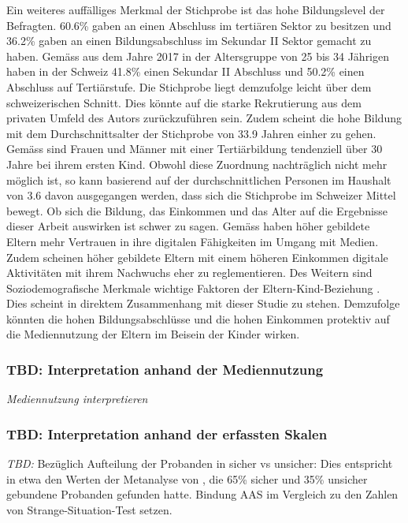 Ein weiteres auffälliges Merkmal der Stichprobe ist das hohe Bildungslevel der Befragten. 60.6\% gaben an einen Abschluss im tertiären Sektor zu besitzen und 36.2\% gaben an einen Bildungsabschluss im Sekundar II Sektor gemacht zu haben. Gemäss  aus dem Jahre 2017 in der Altersgruppe von 25 bis 34 Jährigen haben in der Schweiz 41.8\% einen Sekundar II Abschluss und 50.2\% einen Abschluss auf Tertiärstufe. Die Stichprobe liegt demzufolge leicht über dem schweizerischen Schnitt. Dies könnte auf die starke Rekrutierung aus dem privaten Umfeld des Autors zurückzuführen sein. Zudem scheint die hohe Bildung mit dem Durchschnittsalter der Stichprobe von 33.9 Jahren einher zu gehen. Gemäss  sind  Frauen und Männer mit einer Tertiärbildung tendenziell über 30 Jahre bei ihrem ersten Kind. Obwohl diese Zuordnung nachträglich nicht mehr möglich ist, so kann basierend auf der durchschnittlichen Personen im Haushalt von 3.6 davon ausgegangen werden, dass sich die Stichprobe im Schweizer Mittel bewegt. Ob sich die Bildung, das Einkommen und das Alter auf die Ergebnisse dieser Arbeit auswirken ist schwer zu sagen. Gemäss  haben höher gebildete Eltern mehr Vertrauen in ihre digitalen Fähigkeiten im Umgang mit Medien. Zudem scheinen höher gebildete Eltern mit einem höheren Einkommen digitale Aktivitäten mit ihrem Nachwuchs eher zu reglementieren. Des Weitern sind Soziodemografische Merkmale wichtige Faktoren der Eltern-Kind-Beziehung \cite{Kammerl2012}. Dies scheint in direktem Zusammenhang mit dieser Studie zu stehen. Demzufolge könnten die hohen Bildungsabschlüsse und die hohen Einkommen protektiv auf die Mediennutzung der Eltern im Beisein der Kinder wirken. 

\subsubsection{TBD: Interpretation anhand der Mediennutzung}
\textit{Mediennutzung interpretieren}

\subsubsection{TBD: Interpretation anhand der erfassten Skalen}
\textit{TBD:} Bezüglich Aufteilung der Probanden in sicher vs unsicher: Dies entspricht in etwa den Werten der Metanalyse von , die 65\% sicher und 35\% unsicher gebundene Probanden gefunden hatte. Bindung AAS im Vergleich zu den Zahlen von Strange-Situation-Test setzen.


